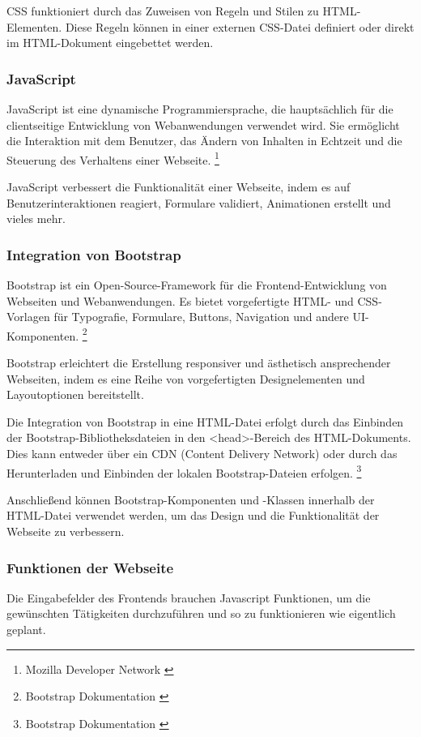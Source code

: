 CSS funktioniert durch das Zuweisen von Regeln und Stilen zu HTML-Elementen. Diese Regeln können in einer externen
CSS-Datei definiert oder direkt im HTML-Dokument eingebettet werden.

\subsubsection*{JavaScript}
JavaScript ist eine dynamische Programmiersprache, die hauptsächlich für die clientseitige Entwicklung von Webanwendungen
verwendet wird. Sie ermöglicht die Interaktion mit dem Benutzer, das Ändern von Inhalten in Echtzeit und die Steuerung
des Verhaltens einer Webseite. \footnote{Mozilla Developer Network \cite{Javascript}}

JavaScript verbessert die Funktionalität einer Webseite, indem es auf Benutzerinteraktionen reagiert, Formulare validiert,
Animationen erstellt und vieles mehr.

\subsubsection*{Integration von Bootstrap}
Bootstrap ist ein Open-Source-Framework für die Frontend-Entwicklung von Webseiten und Webanwendungen. Es bietet
vorgefertigte HTML- und CSS-Vorlagen für Typografie, Formulare, Buttons, Navigation und andere UI-Komponenten. \footnote{Bootstrap Dokumentation \cite{Bootstrap}}

Bootstrap erleichtert die Erstellung responsiver und ästhetisch ansprechender Webseiten, indem es eine Reihe von
vorgefertigten Designelementen und Layoutoptionen bereitstellt.

Die Integration von Bootstrap in eine HTML-Datei erfolgt durch das Einbinden der Bootstrap-Bibliotheksdateien in den
<head>-Bereich des HTML-Dokuments. Dies kann entweder über ein CDN (Content Delivery Network) oder durch das Herunterladen
und Einbinden der lokalen Bootstrap-Dateien erfolgen. \footnote{Bootstrap Dokumentation \cite{CDN-Links}}

Anschließend können Bootstrap-Komponenten und -Klassen innerhalb der HTML-Datei verwendet werden, um das Design und
die Funktionalität der Webseite zu verbessern.

\subsubsection{Funktionen der Webseite}
Die Eingabefelder des Frontends brauchen Javascript Funktionen, um die gewünschten Tätigkeiten durchzuführen und so zu
funktionieren wie eigentlich geplant.

